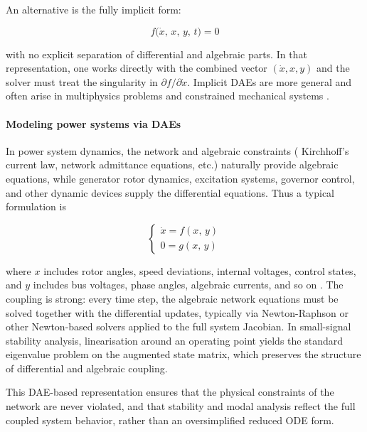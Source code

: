 An alternative is the fully implicit form:  

\begin{equation}
f\bigl(\dot x,\, x,\, y,\, t \bigr) = 0
\end{equation}

with no explicit separation of differential and algebraic parts. In that representation, one works directly with the combined vector $(\dot x, x, y)$ and the solver must treat 
the singularity in $\partial f / \partial \dot x$. Implicit DAEs are more general and often arise in multiphysics problems and constrained mechanical systems \cite{PolitoDAE}.  

\paragraph{Modeling power systems via DAEs}  
In power system dynamics, the network and algebraic constraints ( Kirchhoff’s current law, network admittance equations, etc.) naturally provide algebraic equations, 
while generator rotor dynamics, excitation systems, governor control, and other dynamic devices supply the differential equations. Thus a typical formulation is  

\begin{equation}
\begin{cases}
\dot x = f(x,\, y) \\
0 = g(x,\, y)
\end{cases}
\end{equation}

where $x$ includes rotor angles, speed deviations, internal voltages, control states, and $y$ includes bus voltages, phase angles, algebraic currents, and so on \cite{SauerPaiBook}. 
The coupling is strong: every time step, the algebraic network equations must be solved together with the differential updates, typically via Newton-Raphson or other Newton-based 
solvers applied to the full system Jacobian. In small-signal stability analysis, linearisation around an operating point yields the standard eigenvalue problem on the augmented 
state matrix, which preserves the structure of differential and algebraic coupling.  

This DAE-based representation ensures that the physical constraints of the network are never violated, and that stability and modal analysis reflect the full coupled system behavior,
rather than an oversimplified reduced ODE form.  


\newpage